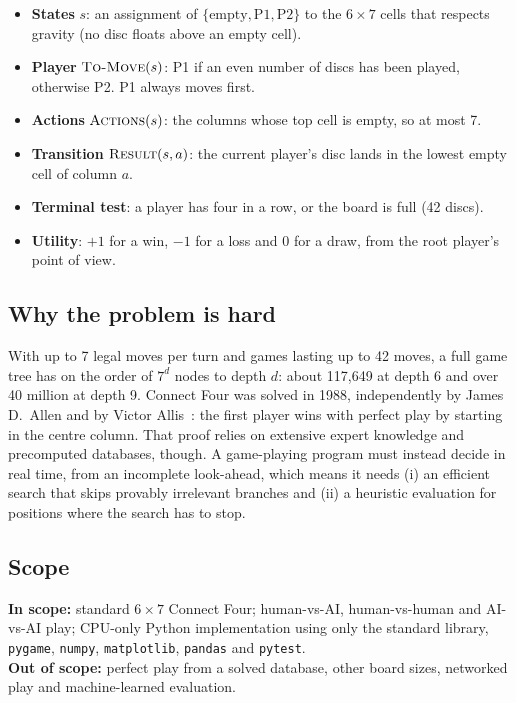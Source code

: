 \documentclass[11pt,a4paper]{article}
\newcommand{\code}[1]{\texttt{\small #1}}
\begin{document}
\begin{itemize}
  \item \textbf{States} $s$: an assignment of $\{\text{empty},\text{P1},\text{P2}\}$ to the $6\times7$ cells that respects gravity (no disc floats above an empty cell).
  \item \textbf{Player} $\textsc{To-Move}(s)$: P1 if an even number of discs has been played, otherwise P2. P1 always moves first.
  \item \textbf{Actions} $\textsc{Actions}(s)$: the columns whose top cell is empty, so at most 7.
  \item \textbf{Transition} $\textsc{Result}(s,a)$: the current player's disc lands in the lowest empty cell of column $a$.
  \item \textbf{Terminal test}: a player has four in a row, or the board is full (42 discs).
  \item \textbf{Utility}: $+1$ for a win, $-1$ for a loss and $0$ for a draw, from the root player's point of view.
\end{itemize}

\subsection{Why the problem is hard}
With up to 7 legal moves per turn and games lasting up to 42 moves, a full game tree has on the order of $7^{d}$ nodes to depth $d$: about 117{,}649 at depth 6 and over 40 million at depth 9. Connect Four was solved in 1988, independently by James D.\ Allen and by Victor Allis~\cite{allis1988}: the first player wins with perfect play by starting in the centre column. That proof relies on extensive expert knowledge and precomputed databases, though. A game-playing program must instead decide in real time, from an incomplete look-ahead, which means it needs (i) an efficient search that skips provably irrelevant branches and (ii) a heuristic evaluation for positions where the search has to stop.

\subsection{Scope}
\textbf{In scope:} standard $6\times7$ Connect Four; human-vs-AI, human-vs-human and AI-vs-AI play; CPU-only Python implementation using only the standard library, \code{pygame}, \code{numpy}, \code{matplotlib}, \code{pandas} and \code{pytest}.\\
\textbf{Out of scope:} perfect play from a solved database, other board sizes, networked play and machine-learned evaluation.
\end{document}
